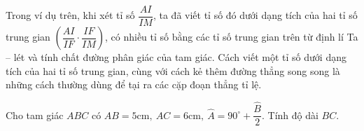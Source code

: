 \begin{note}
Trong ví dụ trên, khi xét tỉ số $\dfrac{AI}{IM}$, ta đã viết tỉ số đó dưới dạng tích của hai tỉ số trung gian $\left(\dfrac{AI}{IF}\cdot \dfrac{IF}{IM}  \right)$, có nhiều tỉ số bằng các tỉ số trung gian trên từ định lí Ta – lét và tính chất đường phân giác của tam giác.
Cách viết một tỉ số dưới dạng tích của hai tỉ số trung gian, cùng với cách kẻ thêm đường thẳng song song là những cách thường dùng để tại ra các cặp đoạn thẳng tỉ lệ.
\end{note}
\begin{vd}%
Cho tam giác $ABC$ có $AB=5\text{cm},\ AC=6\text{cm},\ \widehat{A}=90^\circ+\dfrac{\widehat{B}}{2}.$ Tính độ dài $BC$.
\end{vd}
